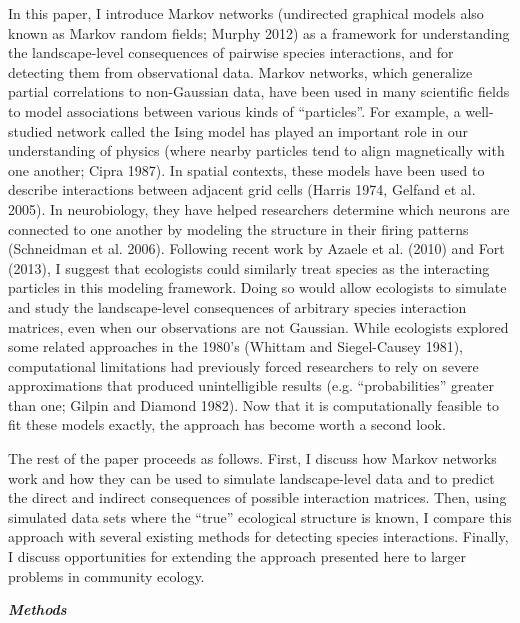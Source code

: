 \documentclass[12pt,]{article}
\begin{document}
\begin{spacing}{1.9}
\begin{flushleft}
In this paper, I introduce Markov networks (undirected graphical models
also known as Markov random fields; Murphy 2012) as a framework for
understanding the landscape-level consequences of pairwise species
interactions, and for detecting them from observational data. Markov
networks, which generalize partial correlations to non-Gaussian data,
have been used in many scientific fields to model associations between
various kinds of ``particles''. For example, a well-studied network
called the Ising model has played an important role in our understanding
of physics (where nearby particles tend to align magnetically with one
another; Cipra 1987). In spatial contexts, these models have been used
to describe interactions between adjacent grid cells (Harris 1974,
Gelfand et al. 2005). In neurobiology, they have helped researchers
determine which neurons are connected to one another by modeling the
structure in their firing patterns (Schneidman et al. 2006). Following
recent work by Azaele et al. (2010) and Fort (2013), I suggest that
ecologists could similarly treat species as the interacting particles in
this modeling framework. Doing so would allow ecologists to simulate and
study the landscape-level consequences of arbitrary species interaction
matrices, even when our observations are not Gaussian. While ecologists
explored some related approaches in the 1980's (Whittam and
Siegel-Causey 1981), computational limitations had previously forced
researchers to rely on severe approximations that produced
unintelligible results (e.g. ``probabilities'' greater than one; Gilpin
and Diamond 1982). Now that it is computationally feasible to fit these
models exactly, the approach has become worth a second look.

The rest of the paper proceeds as follows. First, I discuss how Markov
networks work and how they can be used to simulate landscape-level data
and to predict the direct and indirect consequences of possible
interaction matrices. Then, using simulated data sets where the ``true''
ecological structure is known, I compare this approach with several
existing methods for detecting species interactions. Finally, I discuss
opportunities for extending the approach presented here to larger
problems in community ecology.

\textbf{\emph{Methods}}


\end{flushleft}
\end{spacing}
\end{document}
